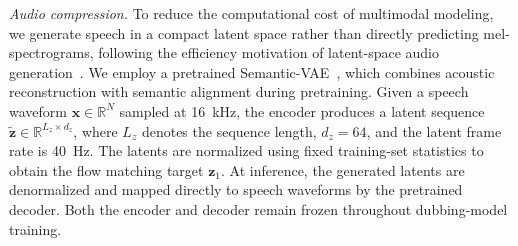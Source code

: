 
\textit{Audio compression.} To reduce the computational cost of multimodal modeling, we generate speech in a compact latent space rather than directly predicting mel-spectrograms, following the efficiency motivation of latent-space audio generation~\cite{cheng2025mmaudio}. We employ a pretrained Semantic-VAE~\cite{niu2025semantic}, which combines acoustic reconstruction with semantic alignment during pretraining. Given a speech waveform $\mathbf{x}\in\mathbb{R}^{N}$ sampled at 16~kHz, the encoder produces a latent sequence $\tilde{\mathbf{z}}\in\mathbb{R}^{L_z\times d_z}$, where $L_z$ denotes the sequence length, $d_z=64$, and the latent frame rate is 40~Hz. The latents are normalized using fixed training-set statistics to obtain the flow matching target $\mathbf{z}_1$. At inference, the generated latents are denormalized and mapped directly to speech waveforms by the pretrained decoder. Both the encoder and decoder remain frozen throughout dubbing-model training.
